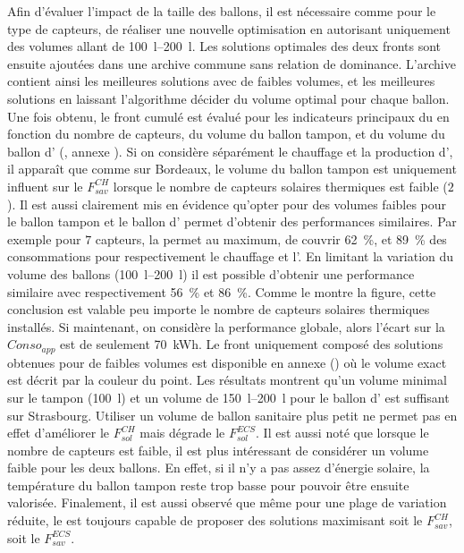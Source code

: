 Afin d’évaluer l’impact de la taille des ballons, il est nécessaire comme pour le type
de capteurs, de réaliser une nouvelle optimisation en autorisant uniquement des volumes allant
de \SIrange{100}{200}{\litre}. Les solutions optimales des deux fronts sont ensuite
ajoutées dans une archive commune sans relation de dominance. L’archive contient ainsi les meilleures
solutions avec de faibles volumes, et les meilleures solutions en laissant l’algorithme décider
du volume optimal pour chaque ballon.
Une fois obtenu, le front cumulé est évalué pour les indicateurs principaux du 
en fonction du nombre de capteurs, du volume du ballon tampon, et du volume du ballon d’
(, annexe ).
Si on considère séparément le chauffage et la production d’,
il apparaît que comme sur Bordeaux, le volume du ballon tampon est uniquement influent
sur le $F_{sav}^{CH}$ lorsque le nombre de capteurs solaires thermiques est faible ($2$).
Il est aussi clairement mis en évidence qu’opter pour des volumes faibles pour le
ballon tampon et le ballon d’ permet d’obtenir des performances similaires.
Par exemple pour $7$ capteurs, la  permet au maximum, de couvrir
\SI{62}{\percent}, et \SI{89}{\percent} des consommations pour respectivement le chauffage et l’.
En limitant la variation du volume des ballons (\SIrange{100}{200}{\litre}) il est possible d’obtenir
une performance similaire avec respectivement
\SI{56}{\percent} et \SI{86}{\percent}. Comme le montre la figure, cette conclusion est valable
peu importe le nombre de capteurs solaires thermiques installés. Si maintenant, on considère
la performance globale, alors l’écart sur la $Conso_{app}$ est de seulement \SI{70}{kWh}.
Le front uniquement composé des solutions obtenues pour de faibles volumes est disponible
en annexe () où le volume exact est décrit par
la couleur du point. Les résultats montrent qu’un volume minimal sur le tampon (\SI{100}{\litre})
et un volume de \SIrange{150}{200}{\litre} pour le ballon d’ est suffisant sur Strasbourg.
Utiliser un volume de ballon sanitaire plus petit ne permet pas en effet d’améliorer le
$F_{sol}^{CH}$ mais dégrade le $F_{sol}^{ECS}$.
Il est aussi noté que lorsque le nombre de capteurs est faible, il est plus intéressant de
considérer un volume faible pour les deux ballons. En effet, si il n’y a pas assez
d’énergie solaire, la température du ballon tampon reste trop basse pour pouvoir être
ensuite valorisée. Finalement, il est aussi observé que même pour une plage de variation
réduite, le  est toujours capable de proposer des solutions maximisant soit le
$F_{sav}^{CH}$, soit le $F_{sav}^{ECS}$.

